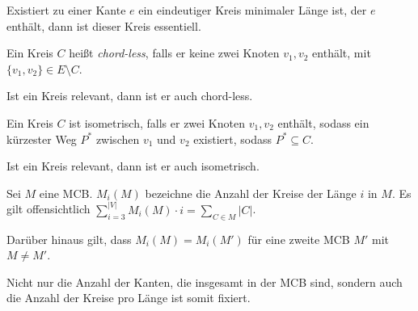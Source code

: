 \begin{proposition}
    Existiert zu einer Kante $ e $ ein eindeutiger Kreis minimaler Länge ist, der $ e $ enthält, dann ist dieser Kreis essentiell.
\end{proposition}

\begin{definition}
    Ein Kreis $ C $ heißt \textit{chord-less}, falls er keine zwei Knoten $ v_1, v_2 $ enthält, mit $ \{ v_1, v_2 \} \in E \setminus C $.
\end{definition}

\begin{proposition}
    Ist ein Kreis relevant, dann ist er auch chord-less.
\end{proposition}

\begin{definition}[Isometrie]
    Ein Kreis $ C $ ist isometrisch, falls er zwei Knoten $ v_1, v_2 $ enthält, sodass ein kürzester Weg $ P^* $ zwischen $ v_1 $ und $ v_2 $ existiert, sodass $ P^* \subseteq C $.
\end{definition}

\begin{proposition}
    Ist ein Kreis relevant, dann ist er auch isometrisch.
\end{proposition}

\begin{lemma}
    Sei $ M $ eine MCB.
    $ M_i(M) $ bezeichne die Anzahl der Kreise der Länge $ i $ in $ M $.
    Es gilt offensichtlich $ \sum^{|V|}_{i = 3} M_i(M) \cdot i = \sum_{C \in M} |C| $.

    Darüber hinaus gilt, dass $ M_i(M) = M_i(M') $ für eine zweite MCB $ M' $ mit $ M \ne M' $.
\end{lemma}

\begin{remark}
    Nicht nur die Anzahl der Kanten, die insgesamt in der MCB sind, sondern auch die Anzahl der Kreise pro Länge ist somit fixiert.
\end{remark}

